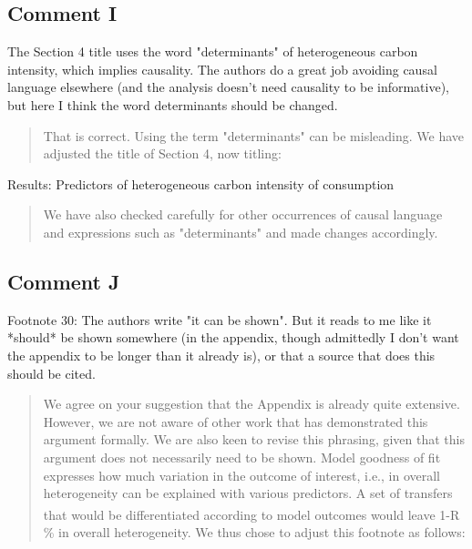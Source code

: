 \documentclass[11pt]{article}
\newenvironment{response}
{\begin{quote}\color{black}}
{\end{quote}}
\begin{document}
\subsection*{Comment I}\label{comment_R1_I}

\begin{commentbox}
    The Section 4 title uses the word "determinants" of heterogeneous carbon intensity, which implies causality. The authors do a great job avoiding causal language elsewhere (and the analysis doesn't need causality to be informative), but here I think the word determinants should be changed.
\end{commentbox}

\begin{response}
    That is correct. Using the term "determinants" can be misleading. We have adjusted the title of Section 4, now titling:
\end{response}

\begin{revisionbox}
    Results: Predictors of heterogeneous carbon intensity of consumption
\end{revisionbox}

\begin{response}
    We have also checked carefully for other occurrences of causal language and expressions such as "determinants" and made changes accordingly.
\end{response}

\subsection*{Comment J}\label{comment_R1_J}

\begin{commentbox}
    Footnote 30: The authors write "it can be shown". But it reads to me like it *should* be shown somewhere (in the appendix, though admittedly I don't want the appendix to be longer than it already is), or that a source that does this should be cited.
\end{commentbox}

\begin{response}
    We agree on your suggestion that the Appendix is already quite extensive. However, we are not aware of other work that has demonstrated this argument formally. We are also keen to revise this phrasing, given that this argument does not necessarily need to be shown. Model goodness of fit expresses how much variation in the outcome of interest, i.e., in overall heterogeneity can be explained with various predictors. A set of transfers that would be differentiated according to model outcomes would leave 1-R\textsuperscript{} \% in overall heterogeneity. We thus chose to adjust this footnote as follows:
\end{response}
\end{document}
